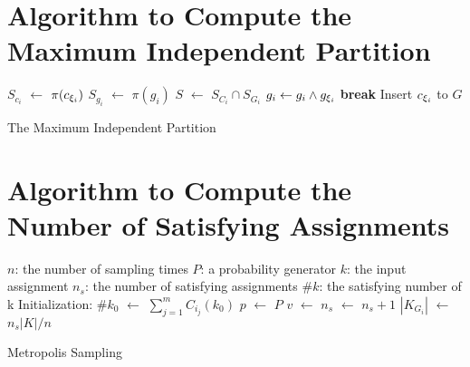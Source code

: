 
\section{Algorithm to Compute the Maximum Independent Partition}
\label{appendix:partition}


\IncMargin{1em}
\begin{algorithm}[h]
      \DontPrintSemicolon
      {
            $S_{c_i}$ $\leftarrow$ $\pi(c_{{\xi}_{i}})$ \;
            {
                  $S_{g_i}$ $\leftarrow$ $\pi(g_{i})$ \;
                  $S$ $\leftarrow$ $S_{C_i} \cap S_{G_i}$  \;
                  {
                        $g_{i} \leftarrow g_{i} \land g_{{\xi}_{i}}$ \;
                        \textbf{break} \;
                  }
                  Insert $c_{{\xi}_{i}}$ to $G$
            }
      }
      \caption{The Maximum Independent Partition}
      \label{algo:max-inde}
\end{algorithm}
\DecMargin{1em}

\section{Algorithm to Compute the Number of Satisfying Assignments}
\label{appendix:montecarlo}

\IncMargin{1em}
\begin{algorithm}
      \SetAlgoLined
      \DontPrintSemicolon


      $n$: the number of sampling times \;
      $P$: a probability generator \;
      $k$: the input assignment \;
      $n_{s}$: the number of satisfying assignments \;
      $\#k$: the satisfying number of k  \;
      Initialization: \;
      $\#{k_0}$ $\leftarrow$ $\sum_{j=1}^{m}C_{i_j}(k_0)$ \;
       {
            $p$ $\leftarrow$ $P$ \;
            {
                  $v$ $\leftarrow$  {}
            }
            {$n_{s}$ $\leftarrow$ $n_{s} + 1$}
      }
      $|K_{G_{i}}|$ $\leftarrow$ $n_s|K| / n$
      \caption{Metropolis Sampling}
\end{algorithm}
\DecMargin{1em}

